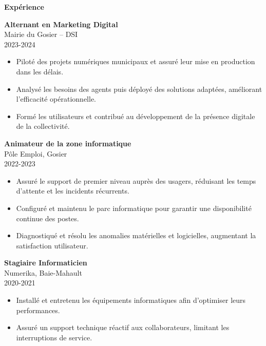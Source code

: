 \documentclass[a4paper]{article}
\renewcommand{\colorbox}[2]{#2}%
\newcommand{\cvsection}[1]{%
  \vspace{6pt}\textbf{\Large #1}\par\vspace{2pt}}
\begin{document}
\cvsection{Expérience}
\begin{adjustwidth}{2cm}{0pt}      %
  
\colorbox{maincolor}{%
  \begin{minipage}{\linewidth}
    \textbf{Alternant en Marketing Digital} \\ Mairie du Gosier – DSI \\ 2023-2024
    \begin{itemize}
      \item Piloté des projets numériques municipaux et assuré leur mise en production dans les délais. \item Analysé les besoins des agents puis déployé des solutions adaptées, améliorant l’efficacité opérationnelle. \item Formé les utilisateurs et contribué au développement de la présence digitale de la collectivité.
    \end{itemize}
  \end{minipage}}

\vspace{3mm}


\colorbox{maincolor}{%
  \begin{minipage}{\linewidth}
    \textbf{Animateur de la zone informatique} \\ Pôle Emploi, Gosier \\ 2022-2023
    \begin{itemize}
      \item Assuré le support de premier niveau auprès des usagers, réduisant les temps d’attente et les incidents récurrents. \item Configuré et maintenu le parc informatique pour garantir une disponibilité continue des postes. \item Diagnostiqué et résolu les anomalies matérielles et logicielles, augmentant la satisfaction utilisateur.
    \end{itemize}
  \end{minipage}}

\vspace{3mm}


\colorbox{maincolor}{%
  \begin{minipage}{\linewidth}
    \textbf{Stagiaire Informaticien} \\ Numerika, Baie-Mahault \\ 2020-2021
    \begin{itemize}
      \item Installé et entretenu les équipements informatiques afin d’optimiser leurs performances. \item Assuré un support technique réactif aux collaborateurs, limitant les interruptions de service.
    \end{itemize}
  \end{minipage}}
\end{adjustwidth}
\end{document}
